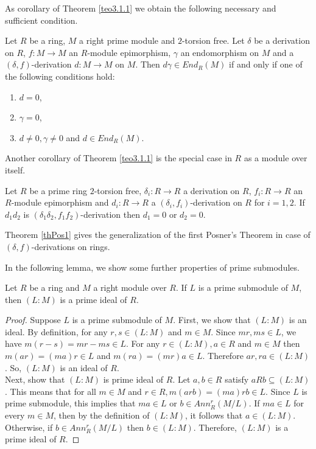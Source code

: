 \documentclass{arxiv}
\begin{document}
As corollary of Theorem \ref{teo3.1.1} we obtain the following necessary and sufficient condition. 


\begin{corollary}\label{remark3.1.1}
    Let $R$ be a ring, $M$ a right prime module and $2$-torsion free. Let $\delta$ be a derivation on $R$,  $f: M \rightarrow M$ an $R$-module epimorphism, $\gamma$ an endomorphism on $M$ and a $(\delta,f)$-derivation $d:M \rightarrow M$ on $M$. Then $d\gamma \in End_R (M)$ if and only if one of the following conditions hold:
    \begin{enumerate}
        \item $d=0$,
        \item $\gamma = 0$,
        \item $d\ne 0, \gamma \ne 0$ and $d \in End_R(M)$.
    \end{enumerate}
\end{corollary}
Another corollary  of Theorem \ref{teo3.1.1} is the special case in $R$ as a module over itself. 
\begin{theorem}\label{thPos1}
    Let $R$ be a prime ring $2$-torsion free,  $\delta_i : R \rightarrow R$ a derivation on $R$, $f_i: R \rightarrow R$ an $R$-module epimorphism and  $d_i:R \rightarrow R$ a  $(\delta_i,f_i)$-derivation
    on $R$ for $i=1,2$. If $d_1d_2$ is $(\delta_1\delta_2,f_1f_2)$-derivation then $d_1 = 0$ or $d_2=0$.
\end{theorem} 
    Theorem \ref{thPos1} gives the generalization of the first Posner's Theorem in case of $(\delta,f)$-derivations on rings.

In the following lemma, we show some further properties of prime submodules. 
\begin{lemma}\label{idealprima}
    Let $R$ be a ring and $M$ a right module over $R$. If $L$ is a prime submodule of $M$, then $(L:M)$ is a prime ideal of  $R$.
\end{lemma}
\begin{proof}
    Suppose $L$ is a prime submodule of $M$. First, we show that $(L:M)$ is an ideal. By definition, for any $r,s \in (L:M)$ and $m \in M$. Since $mr, ms \in L$,  we have $m(r-s)=mr-ms \in L$. For any $r \in (L:M), a\in R$ and $m \in M$ then $m(ar)=(ma)r \in L$ and $m(ra)=(mr)a \in L$. Therefore $ar,ra \in (L:M)$. So, $(L:M)$ is an ideal of $R$.\\
    Next, show that $(L:M)$ is prime ideal of $R$. Let $a,b \in R$ satisfy $aRb \subseteq (L:M)$. This means that for all $m \in M$ and $r \in R, m(arb)=(ma)rb \in L$. Since $L$ is prime submodule, this implies that $ma \in L$ or $b \in Ann_R^r(M/L)$. If $ma \in L$ for every $m \in M$, then by the definition of $(L:M)$, it follows that $a \in (L:M)$. Otherwise, if $b \in Ann_R^r(M/L)$ then $b \in (L:M)$. Therefore, $(L:M)$ is a prime ideal of $R$.
\end{proof}
\end{document}
